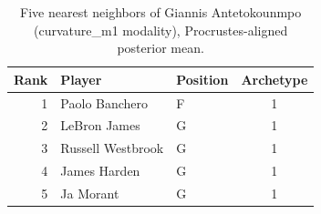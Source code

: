 \begin{table}[htbp]
  \centering\small
  \begin{tabular}{rllc}
    \toprule
    Rank & Player & Position & Archetype \\
    \midrule
    1 & Paolo Banchero & F & 1 \\
    2 & LeBron James & G & 1 \\
    3 & Russell Westbrook & G & 1 \\
    4 & James Harden & G & 1 \\
    5 & Ja Morant & G & 1 \\
    \bottomrule
  \end{tabular}
  \caption{Five nearest neighbors of Giannis Antetokounmpo (curvature_m1 modality), Procrustes-aligned posterior mean.}
  \label{tab:Giannis_Antetokounmpo_neighbors_curvature_m1}
\end{table}


